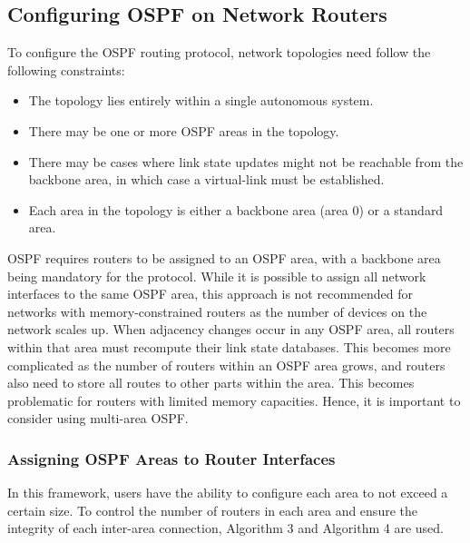 \documentclass{uiucthesis2021}
\begin{document}
\subsection{Configuring OSPF on Network Routers}
\noindent To configure the OSPF routing protocol, network topologies need follow the following constraints:
\begin{itemize}
    \item The topology lies entirely within a single autonomous system.
    \item There may be one or more OSPF areas in the topology.
    \item There may be cases where link state updates might not be reachable from the backbone area, in which case a virtual-link must be established.
    \item Each area in the topology is either a backbone area (area 0) or a standard area. 
\end{itemize}
\noindent OSPF requires routers to be assigned to an OSPF area, with a backbone area being mandatory for the protocol. While it is possible to assign all network interfaces to the same OSPF area, this approach is not recommended for networks with memory-constrained routers as the number of devices on the network scales up. When adjacency changes occur in any OSPF area, all routers within that area must recompute their link state databases. This becomes more complicated as the number of routers within an OSPF area grows, and routers also need to store all routes to other parts within the area. This becomes problematic for routers with limited memory capacities. Hence, it is important to consider using multi-area OSPF.\\

\subsubsection{Assigning OSPF Areas to Router Interfaces}
\noindent In this framework, users have the ability to configure each area to not exceed a certain size. To control the number of routers in each area and ensure the integrity of each inter-area connection, Algorithm 3 and Algorithm 4 are used.\\
\end{document}
